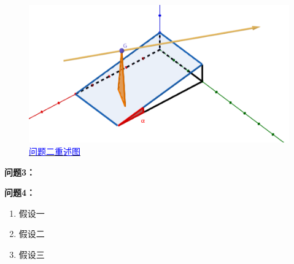 \begin{figure}[h]   
    \centering
    \includegraphics[scale=0.3]{res/img/问题二重述图.png}
    \caption{\href{https://www.geogebra.org/m/pwzyn5ba}{\textcolor{blue}{问题二重述图}}}
    \label{fig:问题二重述图}
\end{figure}

\textbf{问题3：}

\textbf{问题4：}







\begin{enumerate}
    \item 假设一
    \item 假设二
    \item 假设三
\end{enumerate}




